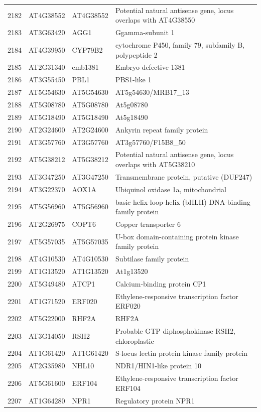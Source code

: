 \documentclass[11pt]{article}
\begin{document}
\begin{center}
\begin{tabular}{rlll}
2182 & AT4G38552 & AT4G38552 & Potential natural antisense gene, locus overlaps with AT4G38550\\
2183 & AT3G63420 & AGG1 & Ggamma-subunit 1\\
2184 & AT4G39950 & CYP79B2 & cytochrome P450, family 79, subfamily B, polypeptide 2\\
2185 & AT2G31340 & emb1381 & Embryo defective 1381\\
2186 & AT3G55450 & PBL1 & PBS1-like 1\\
2187 & AT5G54630 & AT5G54630 & AT5g54630/MRB17\_13\\
2188 & AT5G08780 & AT5G08780 & At5g08780\\
2189 & AT5G18490 & AT5G18490 & At5g18490\\
2190 & AT2G24600 & AT2G24600 & Ankyrin repeat family protein\\
2191 & AT3G57760 & AT3G57760 & AT3g57760/F15B8\_50\\
2192 & AT5G38212 & AT5G38212 & Potential natural antisense gene, locus overlaps with AT5G38210\\
2193 & AT3G47250 & AT3G47250 & Transmembrane protein, putative (DUF247)\\
2194 & AT3G22370 & AOX1A & Ubiquinol oxidase 1a, mitochondrial\\
2195 & AT5G56960 & AT5G56960 & basic helix-loop-helix (bHLH) DNA-binding family protein\\
2196 & AT2G26975 & COPT6 & Copper transporter 6\\
2197 & AT5G57035 & AT5G57035 & U-box domain-containing protein kinase family protein\\
2198 & AT4G10530 & AT4G10530 & Subtilase family protein\\
2199 & AT1G13520 & AT1G13520 & At1g13520\\
2200 & AT5G49480 & ATCP1 & Calcium-binding protein CP1\\
2201 & AT1G71520 & ERF020 & Ethylene-responsive transcription factor ERF020\\
2202 & AT5G22000 & RHF2A & RHF2A\\
2203 & AT3G14050 & RSH2 & Probable GTP diphosphokinase RSH2, chloroplastic\\
2204 & AT1G61420 & AT1G61420 & S-locus lectin protein kinase family protein\\
2205 & AT2G35980 & NHL10 & NDR1/HIN1-like protein 10\\
2206 & AT5G61600 & ERF104 & Ethylene-responsive transcription factor ERF104\\
2207 & AT1G64280 & NPR1 & Regulatory protein NPR1\\

\end{tabular}
\end{center}
\end{document}
